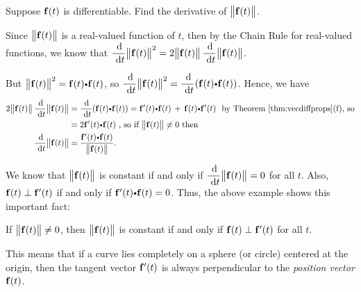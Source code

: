 \begin{exa}\label{exa:absvecderiv}
 Suppose $\mathbf{ f}(t)$ is differentiable. Find the derivative of 
${\left\|\mathbf{ f}(t)\right\|}$.\vspace{1mm}
\begin{solu}
 
Since ${\left\|\mathbf{ f}(t)\right\|}$ is a real-valued 
function of $t$, then by the Chain
 Rule for real-valued functions, we know that
  $\dfrac{\d}{\dt} \norm{\funvect{f}(t)}^2 = 2 \norm{\funvect{f}(t)} \, 
\dfrac{\d}{\dt} \norm{\funvect{f}(t)}$.

 \par\noindent But $\norm{\funvect{f}(t)}^2 = 
\Dotprod{\funvect{f}(t)}{\funvect{f}(t)}$, so
 $\dfrac{\d}{\dt} \norm{\funvect{f}(t)}^2 = \dfrac{\d}{\dt} ( 
\Dotprod{\funvect{f}(t)}{\funvect{f}(t)} )$.
 Hence, we have
 \begin{align*}
  2 \norm{\funvect{f}(t)}\,\dfrac{\d}{\dt} \norm{\funvect{f}(t)} &= 
\dfrac{\d}{\dt} (\Dotprod{\funvect{f}(t)}{\funvect{f}(t)})
  = \Dotprod{\funvect{f}'(t)}{\funvect{f}(t)} \, + \, 
\Dotprod{\funvect{f}(t)}{\funvect{f}'(t)}
   \text{~~by Theorem \ref{thm:vecdiffprops}(f), so}\\
  &= 2 \Dotprod{\funvect{f}'(t)}{\funvect{f}(t)} \text{~,~so if 
$\norm{\funvect{f}(t)} \ne 0$ then}\\
  \dfrac{\d}{\dt} \norm{\funvect{f}(t)} &= 
\dfrac{\Dotprod{\funvect{f}'(t)}{\funvect{f}(t)}}{\norm{\funvect{f}(t)}} .
 \end{align*}
\end{solu}

 
We know that ${\left\|\mathbf{ f}(t)\right\|}$ is constant if and only if 
$\dfrac{\d}{\dt} \norm{\funvect{f}(t)} = 0$ for all $t$.
Also, $\mathbf{ f}(t) \perp \mathbf{ f}'(t)$ if and only if 
$\Dotprod{\funvect{f}'(t)}{\funvect{f}(t)} = 0$. Thus, the
above example shows this important fact:
\begin{prop}
 If ${\left\|\mathbf{ f}(t)\right\|} \ne 0$, then ${\left\|\mathbf{ f}(t)\right\|}$ 
is constant if and only if $\mathbf{ f}(t)
 \perp \mathbf{ f}'(t)$ for all $t$.
\end{prop}

This means that if a curve lies completely on a sphere (or circle) centered at 
the origin, then the tangent vector
$\mathbf{ f}'(t)$ is always perpendicular to the \emph{position vector} 
$\mathbf{ f}(t)$.
\end{exa}
